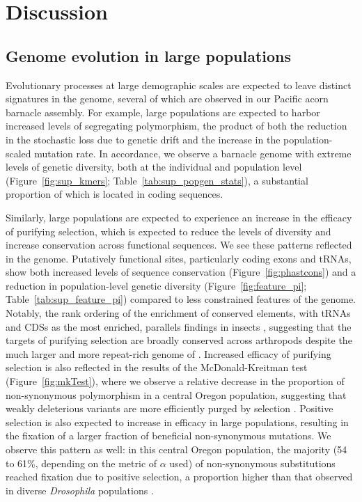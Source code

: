 \section*{Discussion}\label{sec:discussion}

\subsection*{Genome evolution in large populations}

Evolutionary processes at large demographic scales are expected to leave distinct
signatures in the genome, several of which are observed in our Pacific acorn
barnacle assembly.
For example, large populations are expected to harbor increased levels of segregating
polymorphism, the product of both the reduction in the stochastic loss due to
genetic drift and the increase in the population-scaled mutation rate.
In accordance, we observe a barnacle genome with extreme levels of genetic diversity,
both at the individual and population level (Figure~\ref{fig:sup_kmers};
Table~\ref{tab:sup_popgen_stats}), a substantial proportion of which is located in
coding sequences.
\vspace{0.1cm}

Similarly, large populations are expected to experience an increase in the efficacy of
purifying selection, which is expected to reduce the levels of diversity and increase 
conservation across functional sequences.
We see these patterns reflected in the \bgla{} genome.
Putatively functional sites, particularly coding exons and tRNAs, show both increased
levels of sequence conservation (Figure~\ref{fig:phastcons}) and a reduction in
population-level genetic diversity (Figure~\ref{fig:feature_pi};
Table~\ref{tab:sup_feature_pi}) compared to less constrained features of the genome.
Notably, the rank ordering of the enrichment of conserved elements, with tRNAs and CDSs
as the most enriched, parallels findings in insects \citep{siepel_evolutionarily_2005},
suggesting that the targets of purifying selection are broadly conserved across
arthropods despite the much larger and more repeat-rich genome of \bgla{}.
Increased efficacy of purifying selection is also reflected in the results of the
McDonald-Kreitman test (Figure~\ref{fig:mkTest}), where we observe a relative decrease
in the proportion of non-synonymous polymorphism in a central Oregon \bgla{} population,
suggesting that weakly deleterious variants are more efficiently purged by selection
\citep{li_reverse_2008}.
Positive selection is also expected to increase in efficacy in large populations,
resulting in the fixation of a larger fraction of beneficial non-synonymous mutations.
We observe this pattern as well: in this central Oregon population, the majority
(54 to 61\%, depending on the metric of $\alpha$ used) of non-synonymous substitutions
reached fixation due to positive selection, a proportion higher than that observed in
diverse \textit{Drosophila} populations \citep{haller_asymptoticmk_2017}.
\vspace{0.1cm}

